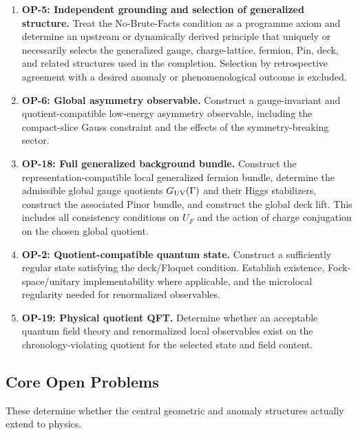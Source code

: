 \documentclass[11pt]{article}
\theoremstyle{canonmath}
\theoremstyle{canonpostulate}
\theoremstyle{canonclaim}
\begin{document}
\begin{enumerate}
\item \textbf{OP-5: Independent grounding and selection of generalized structure.} Treat the No-Brute-Facts condition as a programme axiom and determine an upstream or dynamically derived principle that uniquely or necessarily selects the generalized gauge, charge-lattice, fermion, Pin, deck, and related structures used in the completion. Selection by retrospective agreement with a desired anomaly or phenomenological outcome is excluded.
\item \textbf{OP-6: Global asymmetry observable.} Construct a gauge-invariant and quotient-compatible low-energy asymmetry observable, including the compact-slice Gauss constraint and the effects of the symmetry-breaking sector.
\item \textbf{OP-18: Full generalized background bundle.} Construct the representation-compatible local generalized fermion bundle, determine the admissible global gauge quotients $G_{\rm UV}(\Gamma)$ and their Higgs stabilizers, construct the associated Pinor bundle, and construct the global deck lift. This includes all consistency conditions on $U_F$ and the action of charge conjugation on the chosen global quotient.
\item \textbf{OP-2: Quotient-compatible quantum state.} Construct a sufficiently regular state satisfying the deck/Floquet condition. Establish existence, Fock-space/unitary implementability where applicable, and the microlocal regularity needed for renormalized observables.
\item \textbf{OP-19: Physical quotient QFT.} Determine whether an acceptable quantum field theory and renormalized local observables exist on the chronology-violating quotient for the selected state and field content.
\end{enumerate}

\subsection*{Core Open Problems}
These determine whether the central geometric and anomaly structures actually extend to physics.
\end{document}
